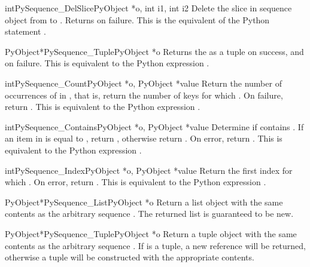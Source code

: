 \documentclass{manual}
\begin{document}
\begin{cfuncdesc}{int}{PySequence_DelSlice}{PyObject *o, int i1, int i2}
Delete the slice in sequence object  from  to .
Returns  on failure. This is the equivalent of the Python
statement .
\end{cfuncdesc}

\begin{cfuncdesc}{PyObject*}{PySequence_Tuple}{PyObject *o}
Returns the  as a tuple on success, and \NULL{} on failure.
This is equivalent to the Python expression .
\end{cfuncdesc}

\begin{cfuncdesc}{int}{PySequence_Count}{PyObject *o, PyObject *value}
Return the number of occurrences of  in , that is,
return the number of keys for which .  On failure, return .  This is equivalent to
the Python expression .
\end{cfuncdesc}

\begin{cfuncdesc}{int}{PySequence_Contains}{PyObject *o, PyObject *value}
Determine if  contains .  If an item in  is
equal to , return , otherwise return .  On
error, return .  This is equivalent to the Python expression
.
\end{cfuncdesc}

\begin{cfuncdesc}{int}{PySequence_Index}{PyObject *o, PyObject *value}
Return the first index  for which .  On error, return .    This is equivalent to
the Python expression .
\end{cfuncdesc}

\begin{cfuncdesc}{PyObject*}{PySequence_List}{PyObject *o}
Return a list object with the same contents as the arbitrary sequence
.  The returned list is guaranteed to be new.
\end{cfuncdesc}

\begin{cfuncdesc}{PyObject*}{PySequence_Tuple}{PyObject *o}
Return a tuple object with the same contents as the arbitrary sequence
.  If  is a tuple, a new reference will be returned,
otherwise a tuple will be constructed with the appropriate contents.
\end{cfuncdesc}
\end{document}
